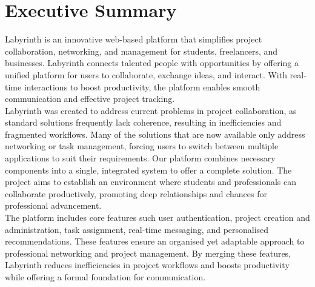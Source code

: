 \documentclass{FastFyp}
\begin{document}
\section*{Executive Summary}
Labyrinth is an innovative web-based platform that simplifies project collaboration, networking, and management for students, freelancers, and businesses.  Labyrinth connects talented people with opportunities by offering a unified platform for users to collaborate, exchange ideas, and interact.  With real-time interactions to boost productivity, the platform enables smooth communication and effective project tracking.\\
Labyrinth was created to address current problems in project collaboration, as standard solutions frequently lack coherence, resulting in inefficiencies and fragmented workflows.  Many of the solutions that are now available only address networking or task management, forcing users to switch between multiple applications to suit their requirements.  Our platform combines necessary components into a single, integrated system to offer a complete solution.  The project aims to establish an environment where students and professionals can collaborate productively, promoting deep relationships and chances for professional advancement. \\
The platform includes core features such user authentication, project creation and administration, task assignment, real-time messaging, and personalised recommendations. These features ensure an organised yet adaptable approach to professional networking and project management. By merging these features, Labyrinth reduces inefficiencies in project workflows and boosts productivity while offering a formal foundation for communication. \\
\end{document}
